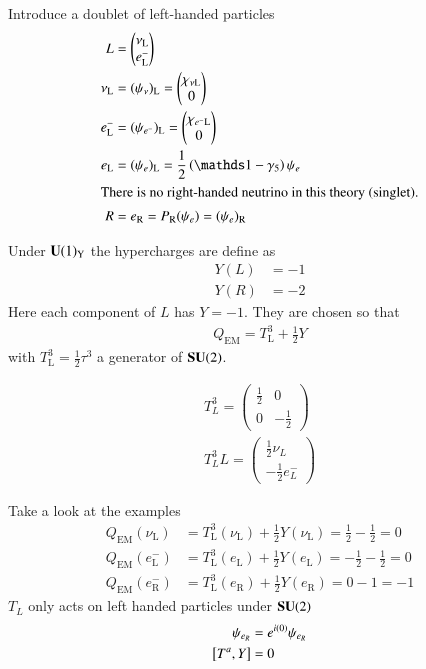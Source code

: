 Introduce a doublet of left-handed particles
\begin{align*}
   L &= \begin{pmatrix} \nu_\text{L} \\ e^-_\text{L} \end{pmatrix} \\
   \nu_\text{L} &= (\psi_\nu)_\text{L} =  \begin{pmatrix} \chi_{\nu \text{L}} \\ 0 \end{pmatrix}    \\
   e_\text{L}^- &= (\psi_{e^-})_\text{L} = \begin{pmatrix} \chi_{e^- \text{L}} \\ 0 \end{pmatrix} \\
   e_\text{L} &= (\psi_e)_\text{L} = \frac{1}{2} \left( \id - \gamma_5 \right) \psi_e \\
   \shortintertext{There is no right-handed neutrino in this theory (singlet).}
   R &= e_\text{R} = P_\text{R} (\psi_e) = (\psi_e)_\text{R}
\end{align*}

Under $\mathbf{U}(1)_\text{Y}$ the hypercharges are define as
\begin{align}
   {Y}(L) &= -1 \\
   {Y}(R) &= -2
\end{align}
Here each component of $L$ has $Y=-1$. They are chosen so that 
\begin{align*}
   Q_{\text{EM}} = T^3_\text{L} + \frac{1}{2} Y
\end{align*}
with $T^3_\text{L} = \frac{1}{2} \tau^3$ a generator of $\mathbf{SU}(2)$.

\begin{align*}
   T^3_L = \begin{pmatrix} \frac{1}{2} & 0 \\ 0 & -\frac{1}{2} \end{pmatrix} \\
   T^3_L L  = \begin{pmatrix} \frac{1}{2} \nu_L \\ -\frac{1}{2} e^-_L\end{pmatrix}
\end{align*}

Take a look at the examples
\begin{align*}
   Q_{\text{EM}}(\nu_\text{L}) &= T^3_\text{L}(\nu_\text{L}) + \frac{1}{2} Y(\nu_\text{L}) = \frac{1}{2} - \frac{1}{2} = 0 \\
   Q_{\text{EM}}(e^-_\text{L}) &= T^3_\text{L}(e_\text{L}) + \frac{1}{2} Y(e_\text{L}) = -\frac{1}{2} - \frac{1}{2} = 0 \\
   Q_{\text{EM}}(e^-_\text{R}) &= T^3_\text{L}(e_\text{R}) + \frac{1}{2} Y(e_\text{R}) = 0 - 1 = -1
\end{align*}
$T_L$ only acts on left handed particles under $\mathbf{SU}(2)$
\begin{align*}
   \psi_{e_R} &= e^{i(0)} \psi_{e_R}  \\
   \comm{T^a}{Y} &= 0
\end{align*}

